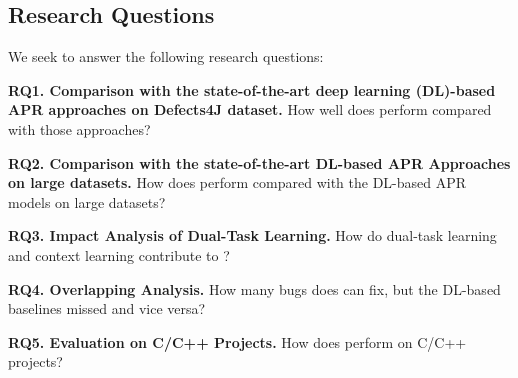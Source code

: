 \subsection{Research Questions}

We seek to answer the following research questions:

\noindent\textbf{RQ1. Comparison with the state-of-the-art deep learning
  (DL)-based APR approaches on Defects4J dataset.}  How well does
                {\tool} perform compared with those approaches?



\noindent\textbf{RQ2. Comparison with the state-of-the-art DL-based APR Approaches on large datasets.}  
How does {\tool} perform compared with the DL-based APR models on large datasets?




\noindent\textbf{RQ3. Impact Analysis of Dual-Task Learning.} How do
dual-task learning and context learning contribute to {\tool}?

\noindent\textbf{RQ4. Overlapping Analysis.} How many bugs does
                {\tool} can fix, but the DL-based baselines missed and
                vice versa?

\noindent\textbf{RQ5. Evaluation on C/C++ Projects.} How does {\tool} perform on C/C++ projects?

